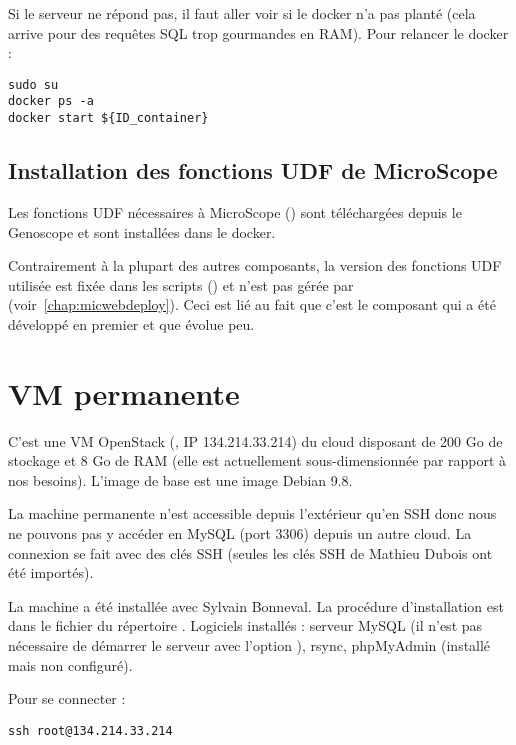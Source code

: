 Si le serveur ne répond pas, il faut aller voir si le docker n'a pas planté (cela arrive pour des requêtes SQL trop gourmandes en RAM).
Pour relancer le docker :
\begin{lstlisting}[style=bash]
sudo su
docker ps -a
docker start ${ID_container}
\end{lstlisting}

\subsection{Installation des fonctions UDF de MicroScope}

Les fonctions UDF nécessaires à MicroScope ()
sont téléchargées depuis le Genoscope et
sont installées dans le docker.

\begin{mycolorbox}
    Contrairement à la plupart des autres composants, la version des fonctions UDF utilisée
    est fixée dans les scripts (\micUDFVersion) et n'est pas gérée par \micWEBdeployVer{} (voir~\autoref{chap:micwebdeploy}).
    Ceci est lié au fait que c'est le composant qui a été développé en premier
    et que  évolue peu.
\end{mycolorbox}

\section{VM permanente}\label{VMpermanente}

C'est une VM OpenStack (, IP 134.214.33.214) du cloud  disposant de 200 Go de stockage et 8 Go de RAM (elle est actuellement sous-dimensionnée par rapport à nos besoins).
L'image de base est une image Debian 9.8.

La machine permanente n'est accessible depuis l'extérieur qu'en SSH donc nous ne pouvons pas y accéder en MySQL (port 3306) depuis un autre cloud.
La connexion se fait avec des clés SSH (seules les clés SSH de Mathieu Dubois ont été importés).

La machine a été installée avec Sylvain Bonneval.
La procédure d'installation est dans le fichier  du répertoire .
Logiciels installés : serveur MySQL (il n'est pas nécessaire de démarrer le serveur avec l'option ), rsync, phpMyAdmin (installé mais non configuré).

Pour se connecter :
\begin{lstlisting}[style=bash]
ssh root@134.214.33.214
\end{lstlisting}

